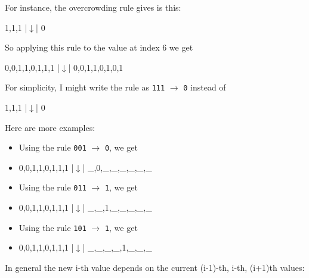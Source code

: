 For instance, the overcrowding rule gives is this:

\begin{consolethree}[escapeinside=||]
1,1,1
  |$\downarrow$|
  0
\end{consolethree}

So applying this rule to the value at index 6 we get

\begin{consolethree}[escapeinside=||]
0,0,1,1,0,1,1,1
            |$\downarrow$|
0,0,1,1,0,1,0,1
\end{consolethree}

For simplicity, I might write the rule as \verb!111! $\rightarrow$ \verb!0! instead of

\begin{consolethree}[escapeinside=||]
1,1,1
  |$\downarrow$|
  0
\end{consolethree}

Here are more examples:

\begin{itemize}

\item
  Using the rule \texttt{001} $\rightarrow$ \texttt{0}, we get
\item
\begin{consolethree}[escapeinside=||]
0,0,1,1,0,1,1,1
  |$\downarrow$|
_,0,_,_,_,_,_,_
\end{consolethree}
\end{itemize}


\begin{itemize}
\item
  Using the rule \texttt{011} $\rightarrow$ \texttt{1}, we get
\item
\begin{consolethree}[escapeinside=||]
0,0,1,1,0,1,1,1
    |$\downarrow$|
_,_,1,_,_,_,_,_
\end{consolethree}
\end{itemize}


\begin{itemize}
\item
  Using the rule \texttt{101} $\rightarrow$ \texttt{1}, we get
\item
\begin{consolethree}[escapeinside=||]
0,0,1,1,0,1,1,1
        |$\downarrow$|
_,_,_,_,1,_,_,_
\end{consolethree}
\end{itemize}


In general the new i-th value depends on the current (i-1)-th, i-th, (i+1)th values:

